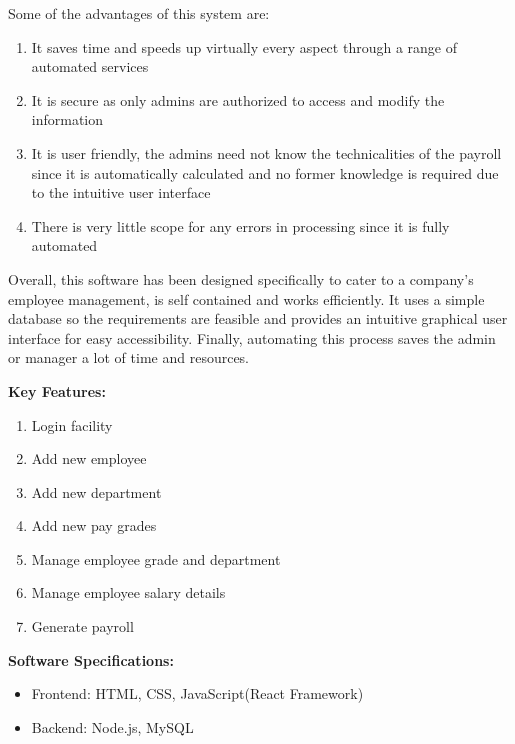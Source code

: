 \documentclass[12pt]{article}
\begin{document}
\newline
\newline
\noindent
Some of the advantages of this system are:
\begin{enumerate}
    \item It saves time and speeds up virtually every aspect through a range of automated services
    \item It is secure as only admins are authorized to access and modify the information
    \item It is user friendly, the admins need not know the technicalities of the payroll since it is automatically calculated and no former knowledge is required due to the intuitive user interface
    \item There is very little scope for any errors in processing since it is fully automated
\end{enumerate}
\noindent
Overall, this software has been designed specifically to cater to a company's employee management, is self contained and works efficiently. It uses a simple database so the requirements are feasible and provides an intuitive graphical user interface for easy accessibility. Finally, automating this process saves the admin or manager a lot of time and resources. 

\noindent
\textbf{Key Features:}
\begin{enumerate}
    \item Login facility
    \item Add new employee
    \item Add new department
    \item Add new pay grades
    \item Manage employee grade and department
    \item Manage employee salary details
    \item Generate payroll
\end{enumerate}
\textbf{Software Specifications:}
\begin{itemize}
    \item Frontend: HTML, CSS, JavaScript(React Framework) 
    \item Backend: Node.js, MySQL
\end{itemize}

\newpage                %
\end{document}
